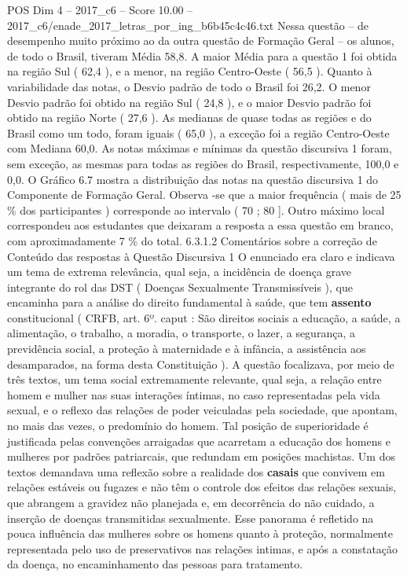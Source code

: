 \begin{textsample}{POS Dim 4 – 2017\_c6 – Score 10.00 – 2017\_c6/enade\_2017\_letras\_por\_ing\_b6b45c4c46.txt}
Nessa questão – de desempenho muito próximo ao da outra questão de Formação Geral – os alunos, de todo o Brasil, tiveram Média 58,8.
A maior Média para a questão 1 foi obtida na região Sul ( 62,4 ), e a menor, na região Centro-Oeste ( 56,5 ).
Quanto à variabilidade das notas, o Desvio padrão de todo o Brasil foi 26,2.
O menor Desvio padrão foi obtido na região Sul ( 24,8 ), e o maior Desvio padrão foi obtido na região Norte ( 27,6 ).
As medianas de quase todas as regiões e do Brasil como um todo, foram iguais ( 65,0 ), a exceção foi a região Centro-Oeste com Mediana 60,0.
As notas máximas e mínimas da questão discursiva 1 foram, sem exceção, as mesmas para todas as regiões do Brasil, respectivamente, 100,0 e 0,0.
O Gráfico 6.7 mostra a distribuição das notas na questão discursiva 1 do Componente de Formação Geral.
Observa -se que a maior frequência ( mais de 25 \% dos participantes ) corresponde ao intervalo ( 70 ; 80 ].
Outro máximo local correspondeu aos estudantes que deixaram a resposta a essa questão em branco, com aproximadamente 7 \% do total. 6.3.1.2 Comentários sobre a correção de Conteúdo das respostas à Questão Discursiva 1 O enunciado era claro e indicava um tema de extrema relevância, qual seja, a incidência de doença grave integrante do rol das DST ( Doenças Sexualmente Transmissíveis ), que encaminha para a análise do direito fundamental à saúde, que tem \textbf{assento} constitucional ( CRFB, art. 6º. caput : São direitos sociais a educação, a saúde, a alimentação, o trabalho, a moradia, o transporte, o lazer, a segurança, a previdência social, a proteção à maternidade e à infância, a assistência aos desamparados, na forma desta Constituição ).
A questão focalizava, por meio de três textos, um tema social extremamente relevante, qual seja, a relação entre homem e mulher nas suas interações íntimas, no caso representadas pela vida sexual, e o reflexo das relações de poder veiculadas pela sociedade, que apontam, no mais das vezes, o predomínio do homem.
Tal posição de superioridade é justificada pelas convenções arraigadas que acarretam a educação dos homens e mulheres por padrões patriarcais, que redundam em posições machistas.
Um dos textos demandava uma reflexão sobre a realidade dos \textbf{casais} que convivem em relações estáveis ou fugazes e não têm o controle dos efeitos das relações sexuais, que abrangem a gravidez não planejada e, em decorrência do não cuidado, a inserção de doenças transmitidas sexualmente.
Esse panorama é refletido na pouca influência das mulheres sobre os homens quanto à proteção, normalmente representada pelo uso de preservativos nas relações intimas, e após a constatação da doença, no encaminhamento das pessoas para tratamento.

\end{textsample}
